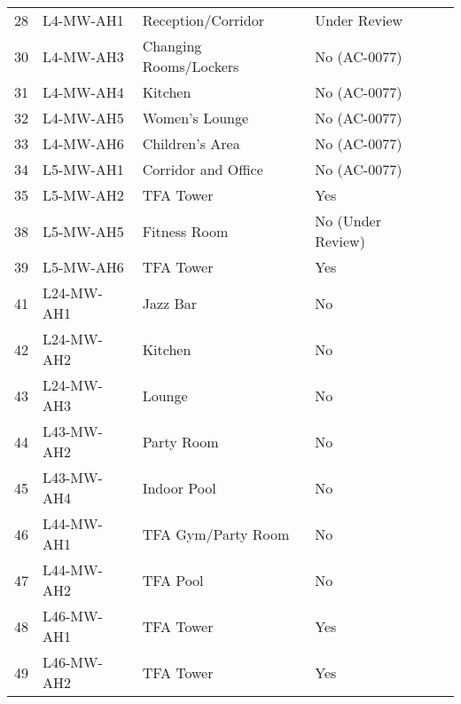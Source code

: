 \begin{table}[htbp]
\begin{tabular}{llp{2.7cm}p{2.7cm}l}
\midrule
 28		& L4-MW-AH1	 &Reception/Corridor	 	 & Under Review				&\\
 30	 	& L4-MW-AH3	 &Changing Rooms/Lockers	 & No (AC-0077)				&\ahuone\\
 31	            & L4-MW-AH4   &Kitchen	 	  	 &No (AC-0077)				&\ahunovfour\\
 32	 	& L4-MW-AH5	 &Women's Lounge	 	 &No (AC-0077)				&\ahunovfour\\
 33	 	& L4-MW-AH6	 &Children's Area	 	 &No (AC-0077)				&\ahunovfour\\
\midrule

 34		 &L5-MW-AH1	 &Corridor and Office	 	 &No (AC-0077)				&\ahunovfour\\
 35	 	 &L5-MW-AH2	 &TFA Tower	 	  	 &Yes	 					&\\
 
 38	 	 &L5-MW-AH5	 &Fitness Room	 	 &No (Under Review)				&\ahunovfour\\
 39	 	 &L5-MW-AH6	 &TFA Tower 	 	  	 &Yes	 					&\\
 
\midrule

 41		& L24-MW-AH1	& Jazz Bar	 	  &No	 	 				&\ahunovone\\
 42	 	 &L24-MW-AH2	& Kitchen	 	  &No	 	 				&\ahunovone\\
 43	 	 &L24-MW-AH3	& Lounge	 	  &No						&\ahunovone\\
\midrule
	 	 
 44		 &L43-MW-AH2	 &Party Room	 	 &No 	 	 				&\ahunovone\\
 45	 	 &L43-MW-AH4	 &Indoor Pool	 	 &No 	 	 				&\ahunovone\\	
\midrule

 46		 &L44-MW-AH1	 &TFA Gym/Party Room &No		 				&\ahunovone\\
 47	 	 &L44-MW-AH2	 &TFA Pool	 	  &No 	 					&\ahunovone\\
\midrule
 48		 &L46-MW-AH1	 &TFA Tower	 	 &Yes	 					&\\
 49	 	 &L46-MW-AH2	 &TFA Tower	 	 &Yes 	 					&\\
\bottomrule
\end{tabular}

\end{table}


